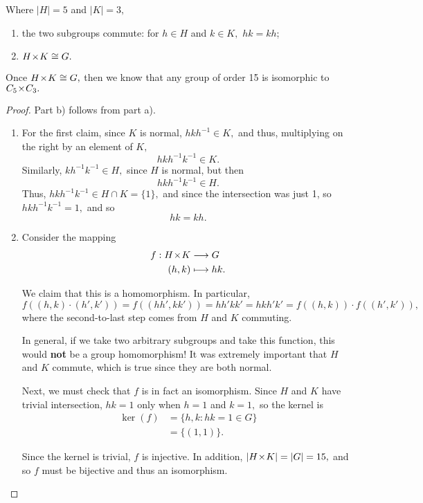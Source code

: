 \begin{proposition}\label{order 15}



Where $|H| = 5$ and $|K| = 3,$

 \begin{enumerate}[label = (\alph*)]
    \item the two subgroups commute: for $h \in H$ and $k \in K,$ $hk = kh$;
    \item $H \hspace{0.05em}{\times}\hspace{0.05em} K \cong G.$
\end{enumerate}
\end{proposition}

Once $H \hspace{0.05em}{\times}\hspace{0.05em} K \cong G,$ then we know that any group of order 15 is isomorphic to $C_5 \hspace{0.05em}{\times}\hspace{0.05em} C_3.$

\begin{proof}

Part b) follows from part a).

\begin{enumerate}[label = (\alph*)]
    \item For the first claim, since $K$ is normal, $hkh^{-1} \in K,$ and thus, multiplying on the right by an element of $K,$ \[hkh^{-1}k^{-1} \in K.\] Similarly, $kh^{-1}k^{-1} \in H,$ since $H$ is normal, but then \[hkh^{-1}k^{-1} \in H.\] Thus, $hkh^{-1}k^{-1} \in H \cap K = \{1\},$ and since the intersection was just 1, so $hkh^{-1}k^{-1} = 1,$ and so \[hk = kh.\]

\item Consider the mapping 
\begin{align*}
f: H \hspace{0.05em}{\times}\hspace{0.05em} K &\longrightarrow G \\
(h, k) &\longmapsto hk.
\end{align*}

We claim that this is a homomorphism. In particular,
\[
f((h, k) \cdot (h', k')) = f((hh', kk')) = hh'kk' = hkh'k' = f((h, k)) \cdot f((h', k')),
\]
where the second-to-last step comes from $H$ and $K$ commuting.

In general, if we take two arbitrary subgroups and take this function, this would \textbf{not} be a group homomorphism! It was extremely important that $H$ and $K$ commute, which is true since they are both normal.


Next, we must check that $f$ is in fact an isomorphism. Since $H$ and $K$ have trivial intersection, $hk = 1$ only when $h = 1$ and $k = 1,$ so the kernel is
\begin{align*}
\ker(f) &= \{h, k: hk = 1 \in G\} \\
&= \{(1, 1)\}.
\end{align*}

Since the kernel is trivial, $f$ is injective. In addition, $|H \hspace{0.05em}{\times}\hspace{0.05em} K| = |G| = 15,$ and so $f$ must be bijective and thus an isomorphism.

\end{enumerate}


\end{proof}

